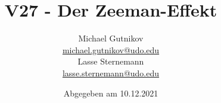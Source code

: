 

\title{V27 - Der Zeeman-Effekt}
\author{
  Michael Gutnikov\\
  \href{mailto:michael.gutnikov@udo.edu}{michael.gutnikov@udo.edu}\\
  Lasse Sternemann\\
  \href{mailto:lasse.sternemann@udo.edu}{lasse.sternemann@udo.edu}
}
\date{Abgegeben am 10.12.2021}


    \maketitle
    \newpage
    \tableofcontents
    \newpage

    


    \newpage
    \printbibliography

